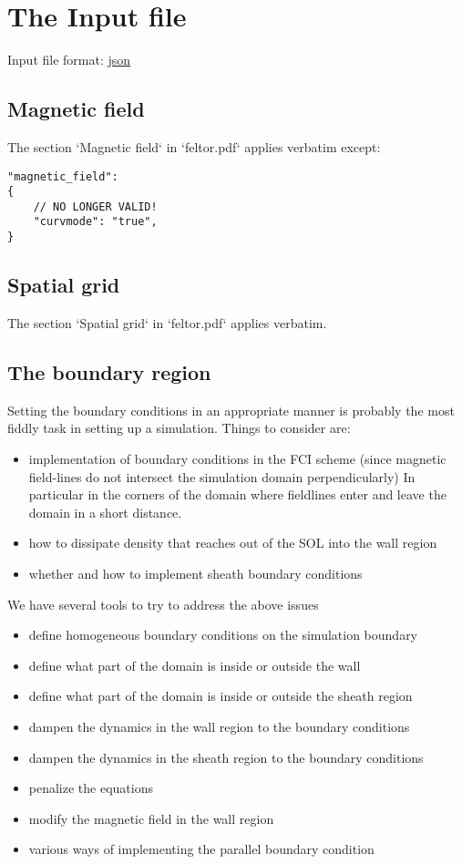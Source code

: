 \section{The Input file} \label{sec:input_file}
Input file format: \href{https://en.wikipedia.org/wiki/JSON}{json}

\subsection{Magnetic field} \label{sec:geometry_file}
The section `Magnetic field` in `feltor.pdf` applies verbatim except:

\begin{verbatim}
"magnetic_field":
{
    // NO LONGER VALID!
    "curvmode": "true",
}
\end{verbatim}

\subsection{Spatial grid} \label{sec:spatial}
The section `Spatial grid` in `feltor.pdf` applies verbatim.
\subsection{The boundary region} \label{sec:boundary}
Setting the boundary conditions in an appropriate manner is probably the most
fiddly task in setting up a simulation. Things to consider are:
\begin{itemize}
\item implementation of boundary conditions in the FCI scheme (since
    magnetic field-lines do not intersect the simulation domain perpendicularly)
    In particular in the corners of the domain where fieldlines enter and leave
    the domain in a short distance.
\item how to dissipate density that reaches out of the SOL into the wall region
\item whether and how to implement sheath boundary conditions
\end{itemize}
We have several tools to try to address the above issues
\begin{itemize}
    \item define homogeneous boundary conditions on the simulation boundary
    \item define what part of the domain is inside or outside the wall
    \item define what part of the domain is inside or outside the sheath region
    \item dampen the dynamics in the wall region to the boundary conditions
    \item dampen the dynamics in the sheath region to the boundary conditions
    \item penalize the equations
    \item modify the magnetic field in the wall region
    \item various ways of implementing the parallel boundary condition
\end{itemize}

